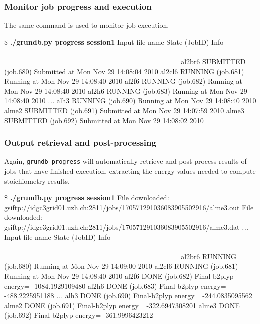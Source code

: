 \documentclass {beamer}
\newcommand{\largeskip}{\vspace{1em}}
\def\+{\largeskip}
\begin{document}
\begin{frame}[fragile]
  \frametitle{Monitor job progress and execution}

  The same command is used to monitor job execution.
  \+
  \begin{footnotesize}
\begin{semiverbatim}
\$ {\bf ./grundb.py progress session1}
Input file name  State (JobID)       Info
==============================================================================
al2br6           SUBMITTED (job.680)  Submitted at Mon Nov 29 14:08:04 2010
al2cl6           RUNNING (job.681)   Running at Mon Nov 29 14:08:40 2010
al2f6            RUNNING (job.682)   Running at Mon Nov 29 14:08:40 2010
al2h6            RUNNING (job.683)   Running at Mon Nov 29 14:08:40 2010
  {\em ...}
alh3             RUNNING (job.690)   Running at Mon Nov 29 14:08:40 2010
alme2            SUBMITTED (job.691)  Submitted at Mon Nov 29 14:07:59 2010
alme3            SUBMITTED (job.692)  Submitted at Mon Nov 29 14:08:02 2010
\end{semiverbatim}    
  \end{footnotesize}
\end{frame}

\begin{frame}[fragile]
  \frametitle{Output retrieval and post-processing}

  Again, \texttt{grundb progress} will automatically retrieve and
  post-process results of jobs that have finished execution,
  extracting the energy values needed to compute stoichiometry results.
  \+
  \begin{footnotesize}
\begin{semiverbatim}
\$ {\bf ./grundb.py progress session1}
File downloaded: gsiftp://idgc3grid01.uzh.ch:2811/jobs/170571291036083905502916/alme3.out
File downloaded: gsiftp://idgc3grid01.uzh.ch:2811/jobs/170571291036083905502916/alme3.dat
  {\em ...}
Input file name  State (JobID)       Info
==============================================================================
al2br6           RUNNING (job.680)   Running at Mon Nov 29 14:09:00 2010
al2cl6           RUNNING (job.681)   Running at Mon Nov 29 14:08:40 2010
al2f6            DONE (job.682)      Final-b2plyp energy= -1084.1929109480 
al2h6            DONE (job.683)      Final-b2plyp energy= -488.2225951188 
  {\em ...}
alh3             DONE (job.690)      Final-b2plyp energy= -244.0835095562 
alme2            DONE (job.691)      Final-b2plyp energy= -322.6947308201 
alme3            DONE (job.692)      Final-b2plyp energy= -361.9996423212 
\end{semiverbatim}    
  \end{footnotesize}
\end{frame}
\end{document}
